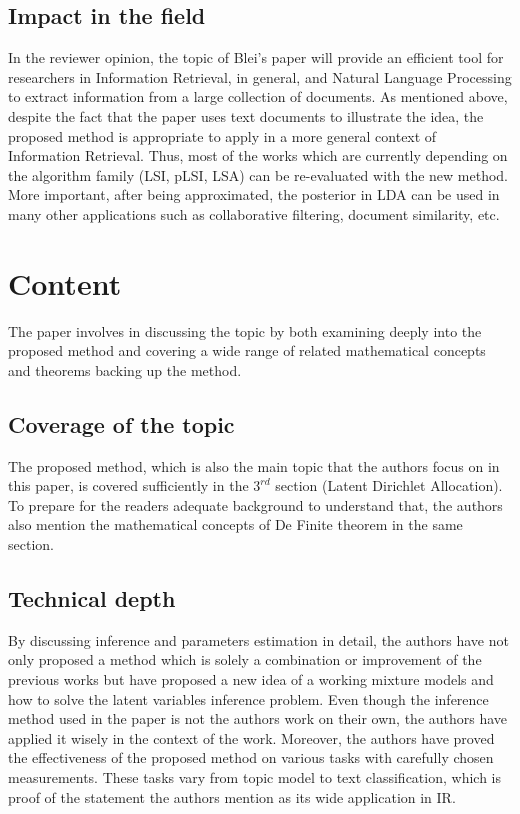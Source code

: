 \documentclass[conference,compsoc]{IEEEtran}
\begin{document}
	\subsection{Impact in the field}
	In the reviewer opinion, the topic of Blei's paper will provide an efficient tool for researchers in Information Retrieval, in general, and Natural Language Processing to extract information from a large collection of documents. As mentioned above, despite the fact that the paper uses text documents to illustrate the idea, the proposed method is appropriate to apply in a more general context of Information Retrieval. Thus, most of the works which are currently depending on the algorithm family (LSI, pLSI, LSA) can be re-evaluated with the new method. More important, after being approximated, the posterior in LDA can be used in many other applications such as collaborative filtering, document similarity, etc.
	
	
	\section{Content}

	The paper involves in discussing the topic by both examining deeply into the proposed method and covering a wide range of related mathematical concepts and theorems backing up the method.
	
	\subsection{Coverage of the topic}
	The proposed method, which is also the main topic that the authors focus on in this paper, is covered sufficiently in the $3^{rd}$ section (Latent Dirichlet Allocation). To prepare for the readers adequate background to understand that, the authors also mention the mathematical concepts of De Finite theorem in the same section.
	
	\subsection{Technical depth}
	By discussing inference and parameters estimation in detail, the authors have not only proposed a method which is solely a combination or improvement of the previous works but have proposed a new idea of a working mixture models and how to solve the latent variables inference problem. Even though the inference method used in the paper is not the authors work on their own, the authors have applied it wisely in the context of the work. Moreover, the authors have proved the effectiveness of the proposed method on various tasks with carefully chosen measurements. These tasks vary from topic model to text classification, which is proof of the statement the authors mention as its wide application in IR.
	
\end{document}
